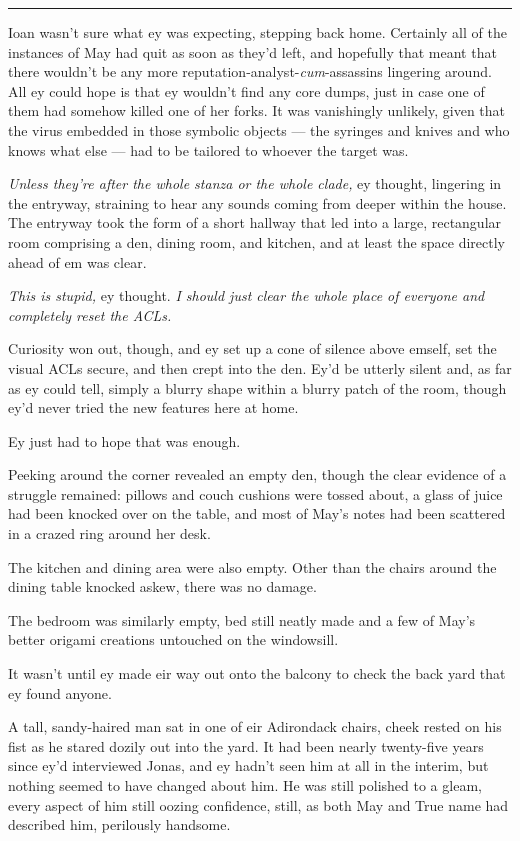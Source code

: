\begin{center}\rule{0.5\linewidth}{0.5pt}\end{center}

Ioan wasn't sure what ey was expecting, stepping back home. Certainly all of the instances of May had quit as soon as they'd left, and hopefully that meant that there wouldn't be any more reputation-analyst-\emph{cum}-assassins lingering around. All ey could hope is that ey wouldn't find any core dumps, just in case one of them had somehow killed one of her forks. It was vanishingly unlikely, given that the virus embedded in those symbolic objects — the syringes and knives and who knows what else — had to be tailored to whoever the target was.

\emph{Unless they're after the whole stanza or the whole clade,} ey thought, lingering in the entryway, straining to hear any sounds coming from deeper within the house. The entryway took the form of a short hallway that led into a large, rectangular room comprising a den, dining room, and kitchen, and at least the space directly ahead of em was clear.

\emph{This is stupid,} ey thought. \emph{I should just clear the whole place of everyone and completely reset the ACLs.}

Curiosity won out, though, and ey set up a cone of silence above emself, set the visual ACLs secure, and then crept into the den. Ey'd be utterly silent and, as far as ey could tell, simply a blurry shape within a blurry patch of the room, though ey'd never tried the new features here at home.

Ey just had to hope that was enough.

Peeking around the corner revealed an empty den, though the clear evidence of a struggle remained: pillows and couch cushions were tossed about, a glass of juice had been knocked over on the table, and most of May's notes had been scattered in a crazed ring around her desk.

The kitchen and dining area were also empty. Other than the chairs around the dining table knocked askew, there was no damage.

The bedroom was similarly empty, bed still neatly made and a few of May's better origami creations untouched on the windowsill.

It wasn't until ey made eir way out onto the balcony to check the back yard that ey found anyone.

A tall, sandy-haired man sat in one of eir Adirondack chairs, cheek rested on his fist as he stared dozily out into the yard. It had been nearly twenty-five years since ey'd interviewed Jonas, and ey hadn't seen him at all in the interim, but nothing seemed to have changed about him. He was still polished to a gleam, every aspect of him still oozing confidence, still, as both May and True name had described him, perilously handsome.

